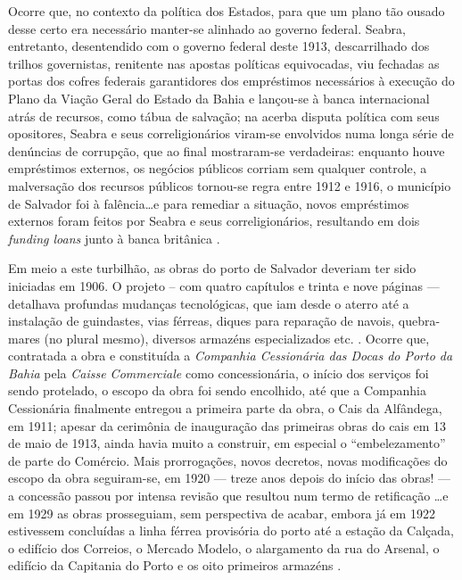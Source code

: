 Ocorre que, no contexto da política dos Estados, para que um plano tão ousado desse certo era necessário manter-se alinhado ao governo federal. Seabra, entretanto, desentendido com o governo federal deste 1913, descarrilhado dos trilhos governistas, renitente nas apostas políticas equivocadas, viu fechadas as portas dos cofres federais garantidores dos empréstimos necessários à execução do Plano da Viação Geral do Estado da Bahia e lançou-se à banca internacional atrás de recursos, como tábua de salvação; na acerba disputa política com seus opositores, Seabra e seus correligionários viram-se envolvidos numa longa série de denúncias de corrupção, que ao final mostraram-se verdadeiras: enquanto houve empréstimos externos, os negócios públicos corriam sem qualquer controle, a malversação dos recursos públicos tornou-se regra entre 1912 e 1916, o município de Salvador foi à falência\dots e para remediar a situação, novos empréstimos externos foram feitos por Seabra e seus correligionários, resultando em dois \textit{funding loans} junto à banca britânica \cite[pp.~217-221]{joaci_porto_2016}.

Em meio a este turbilhão, as obras do porto de Salvador deveriam ter sido iniciadas em 1906. O projeto -- com quatro capítulos e trinta e nove páginas --- detalhava profundas mudanças tecnológicas, que iam desde o aterro até a instalação de guindastes, vias férreas, diques para reparação de navois, quebra-mares (no plural mesmo), diversos armazéns especializados etc. \cite[p.~186]{rosado_porto_2016}. Ocorre que, contratada a obra e constituída a \textit{Companhia Cessionária das Docas do Porto da Bahia} pela \textit{Caisse Commerciale} como concessionária, o início dos serviços foi sendo protelado, o escopo da obra foi sendo encolhido, até que a Companhia Cessionária finalmente entregou a primeira parte da obra, o Cais da Alfândega, em 1911; apesar da cerimônia de inauguração das primeiras obras do cais em 13 de maio de 1913, ainda havia muito a construir, em especial o ``embelezamento'' de parte do Comércio. Mais prorrogações, novos decretos, novas modificações do escopo da obra seguiram-se, em 1920 --- treze anos depois do início das obras! --- a concessão passou por intensa revisão que resultou num termo de retificação \dots e em 1929 as obras prosseguiam, sem perspectiva de acabar, embora já em 1922 estivessem concluídas a linha férrea provisória do porto até a estação da Calçada, o edifício dos Correios, o Mercado Modelo, o alargamento da rua do Arsenal, o edifício da Capitania do Porto e os oito primeiros armazéns \cite[p.~186-196]{rosado_porto_2016}. 

